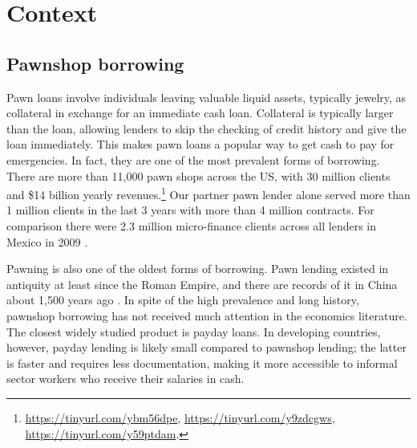 \documentclass[oneside,11pt]{article}
\begin{document}


\section{Context} \label{context}

\subsection{Pawnshop borrowing}
    
Pawn loans involve individuals leaving valuable liquid assets, typically jewelry, as collateral in exchange for an immediate cash loan. Collateral is typically larger than the loan, allowing lenders to skip the checking of credit history and give the loan immediately. This makes pawn loans a popular way to get cash to pay for emergencies. In fact, they are one of the most prevalent forms of borrowing. There are more than 11,000 pawn shops across the US, with 30 million clients and \$14 billion yearly revenues.\footnote{\url{https://tinyurl.com/ybm56dpe}, \url{https://tinyurl.com/y9zdcgws}, \url{https://tinyurl.com/y59ptdam}.} Our partner pawn lender alone served more than 1 million clients in the last 3 years with more than 4 million contracts. For comparison there were 2.3 million micro-finance clients across all lenders in Mexico in 2009 \citep{Pedroza:2010}. 

Pawning is also one of the oldest forms of borrowing. Pawn lending existed in antiquity at least since the Roman Empire, and there are records of it in China about 1,500 years ago \citep{PawnShops}. In spite of the high prevalence and long history, pawnshop borrowing has not received much attention in the economics literature. The closest widely studied product is payday loans. In developing countries, however, payday lending is likely small compared to pawnshop lending; the latter is faster and requires less documentation, making it more accessible to informal sector workers who receive their salaries in cash. %
\end{document}
